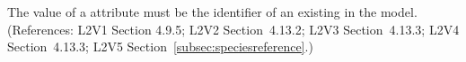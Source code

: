 The value of a \SpeciesReference {} attribute must be the
identifier of an existing \Species in the model.  (References: L2V1 Section
4.9.5; L2V2 Section~4.13.2; L2V3 Section~4.13.3; L2V4 Section~4.13.3; L2V5 Section~\ref{subsec:speciesreference}.)

